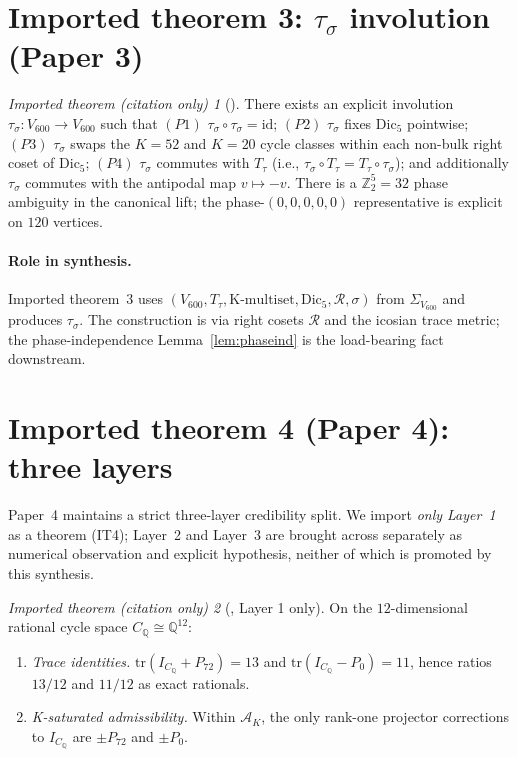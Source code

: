 \documentclass[11pt]{article}
\theoremstyle{remark}
\newtheorem*{importedTheorem}{Imported theorem (citation only)}
\newcommand{\Vsixhundred}{V_{600}}
\newcommand{\Dicfive}{\mathrm{Dic}_5}
\newcommand{\Sigmaspine}{\Sigma_{\Vsixhundred}}
\newcommand{\CQ}{C_{\mathbb{Q}}}
\newcommand{\Ttau}{T_{\tau}}
\newcommand{\sigmaG}{\sigma}
\newcommand{\tausigma}{\tau_\sigma}
\newcommand{\AK}{\mathcal{A}_K}
\newcommand{\PK}[1]{P_{#1}}
\begin{document}
\section{Imported theorem 3: $\tausigma$ involution (Paper 3)}\label{sec:p3}

\begin{importedTheorem}[\citealp{V600Paper3}]
There exists an explicit involution $\tausigma : \Vsixhundred \to
\Vsixhundred$ such that
$(P1)$ $\tausigma \circ \tausigma = \mathrm{id}$;
$(P2)$ $\tausigma$ fixes $\Dicfive$ pointwise;
$(P3)$ $\tausigma$ swaps the $K=52$ and $K=20$ cycle classes within
each non-bulk right coset of $\Dicfive$;
$(P4)$ $\tausigma$ commutes with $\Ttau$ (i.e.,
$\tausigma \circ \Ttau = \Ttau \circ \tausigma$);
and additionally $\tausigma$ commutes with the antipodal map
$v \mapsto -v$. There is a $\mathbb{Z}_2^5 = 32$ phase ambiguity in
the canonical lift; the phase-$(0,0,0,0,0)$ representative is
explicit on $120$ vertices.
\end{importedTheorem}

\paragraph{Role in synthesis.}
Imported theorem~3 uses $(\Vsixhundred, \Ttau, \mathrm{K\text{-multiset}},
\Dicfive, \mathcal{R}, \sigmaG)$ from $\Sigmaspine$ and produces
$\tausigma$. The construction is via right cosets $\mathcal{R}$ and
the icosian trace metric; the phase-independence
Lemma~\ref{lem:phaseind} is the load-bearing fact downstream.

\section{Imported theorem 4 (Paper 4): three layers}\label{sec:p4}

Paper~4 maintains a strict three-layer credibility split. We import
\emph{only Layer~1} as a theorem (IT4); Layer~2 and Layer~3 are
brought across separately as numerical observation and explicit
hypothesis, neither of which is promoted by this synthesis.

\begin{importedTheorem}[\citealp{V600Paper4}, Layer 1 only]
On the $12$-dimensional rational cycle space
$\CQ \cong \mathbb{Q}^{12}$:
\begin{enumerate}[leftmargin=2em]
\item \emph{Trace identities.}
$\mathrm{tr}(I_{\CQ} + \PK{72}) = 13$ and
$\mathrm{tr}(I_{\CQ} - \PK{0}) = 11$, hence ratios
$13/12$ and $11/12$ as exact rationals.
\item \emph{K-saturated admissibility.} Within $\AK$, the only
rank-one projector corrections to $I_{\CQ}$ are
$\pm \PK{72}$ and $\pm \PK{0}$.
\end{enumerate}
\end{importedTheorem}
\end{document}
